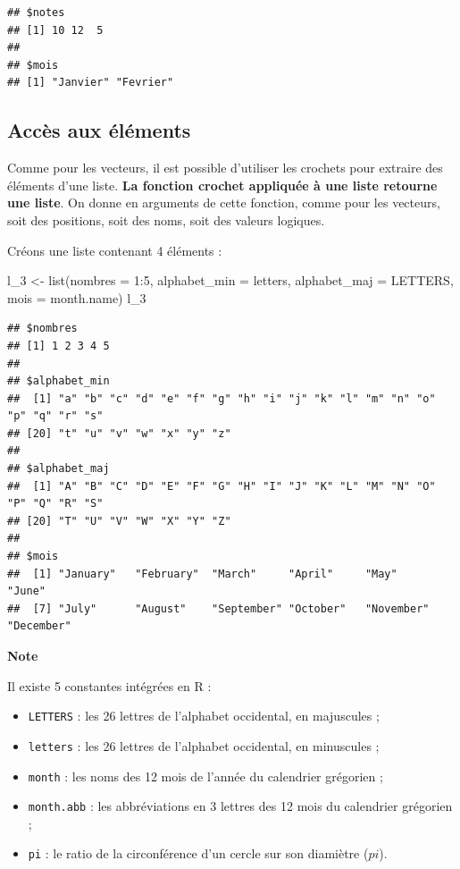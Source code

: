 \documentclass[
  11pt,
]{book}
\newenvironment{Shaded}{\begin{snugshade}}{\end{snugshade}}
\newcommand{\AttributeTok}[1]{\textcolor[rgb]{0.77,0.63,0.00}{#1}}
\newcommand{\DecValTok}[1]{\textcolor[rgb]{0.00,0.00,0.81}{#1}}
\newcommand{\FunctionTok}[1]{\textcolor[rgb]{0.00,0.00,0.00}{#1}}
\newcommand{\NormalTok}[1]{#1}
\newcommand{\OtherTok}[1]{\textcolor[rgb]{0.56,0.35,0.01}{#1}}
\newcommand{\SpecialCharTok}[1]{\textcolor[rgb]{0.00,0.00,0.00}{#1}}
\providecommand{\tightlist}{%
  \setlength{\itemsep}{0pt}\setlength{\parskip}{0pt}}
\numberwithin{equation}{section}
\numberwithin{countremarque}{section}
\newenvironment{notebox}{
  \begin{tcolorbox}[breakable, colback=jaune,coltext=black,
                  colframe=grisfonce]}
 {\end{tcolorbox}}
\begin{document}
\begin{lstlisting}
## $notes
## [1] 10 12  5
## 
## $mois
## [1] "Janvier" "Fevrier"
\end{lstlisting}

\hypertarget{accuxe8s-aux-uxe9luxe9ments}{%
\subsection{Accès aux éléments}\label{accuxe8s-aux-uxe9luxe9ments}}

Comme pour les vecteurs, il est possible d'utiliser les crochets pour extraire des éléments d'une liste. \textbf{La fonction crochet appliquée à une liste retourne une liste}. On donne en arguments de cette fonction, comme pour les vecteurs, soit des positions, soit des noms, soit des valeurs logiques.

Créons une liste contenant 4 éléments :

\begin{Shaded}
\begin{Highlighting}[]
\NormalTok{l\_3 }\OtherTok{\textless{}{-}} \FunctionTok{list}\NormalTok{(}\AttributeTok{nombres =} \DecValTok{1}\SpecialCharTok{:}\DecValTok{5}\NormalTok{, }\AttributeTok{alphabet\_min =}\NormalTok{ letters,}
            \AttributeTok{alphabet\_maj =}\NormalTok{ LETTERS, }\AttributeTok{mois =}\NormalTok{ month.name)}
\NormalTok{l\_3}
\end{Highlighting}
\end{Shaded}

\begin{lstlisting}
## $nombres
## [1] 1 2 3 4 5
## 
## $alphabet_min
##  [1] "a" "b" "c" "d" "e" "f" "g" "h" "i" "j" "k" "l" "m" "n" "o" "p" "q" "r" "s"
## [20] "t" "u" "v" "w" "x" "y" "z"
## 
## $alphabet_maj
##  [1] "A" "B" "C" "D" "E" "F" "G" "H" "I" "J" "K" "L" "M" "N" "O" "P" "Q" "R" "S"
## [20] "T" "U" "V" "W" "X" "Y" "Z"
## 
## $mois
##  [1] "January"   "February"  "March"     "April"     "May"       "June"     
##  [7] "July"      "August"    "September" "October"   "November"  "December"
\end{lstlisting}

\begin{notebox}

\textbf{Note}

Il existe 5 constantes intégrées en R :

\begin{itemize}
\tightlist
\item
  \texttt{LETTERS} : les 26 lettres de l'alphabet occidental, en majuscules ;
\item
  \texttt{letters} : les 26 lettres de l'alphabet occidental, en minuscules ;
\item
  \texttt{month} : les noms des 12 mois de l'année du calendrier grégorien ;
\item
  \texttt{month.abb} : les abbréviations en 3 lettres des 12 mois du calendrier grégorien ;
\item
  \texttt{pi} : le ratio de la circonférence d'un cercle sur son diamiètre (\(pi\)).
\end{itemize}

\end{notebox}
\end{document}
